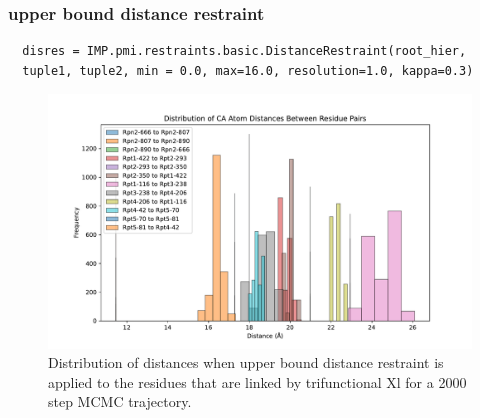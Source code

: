 \documentclass[a4paper,8pt]{beamer}
\begin{document}
%
\begin{frame}[fragile=singleslide]
\frametitle{upper bound distance restraint}
\begin{verbatim}
  disres = IMP.pmi.restraints.basic.DistanceRestraint(root_hier, 
  tuple1, tuple2, min = 0.0, max=16.0, resolution=1.0, kappa=0.3)
  \end{verbatim}
  \begin{figure}
    \centering
    \includegraphics[scale=0.3]{test-figures/disres_dist.pdf}
    \caption{Distribution of distances when upper bound distance restraint is 
    applied to the residues that are linked by trifunctional Xl for a 2000 step MCMC trajectory.}
  \end{figure}
\end{frame}
%
\end{document}
